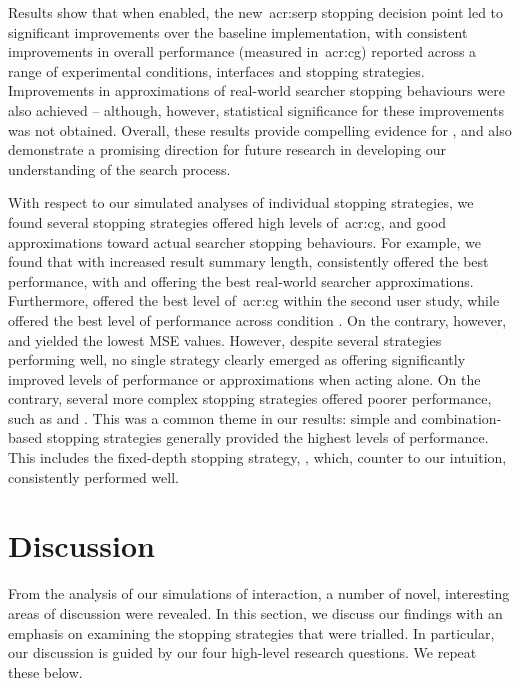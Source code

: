 Results show that when enabled, the new~\gls{acr:serp} stopping decision point led to significant improvements over the baseline implementation, with consistent improvements in overall performance (measured in~\gls{acr:cg}) reported across a range of experimental conditions, interfaces and stopping strategies. Improvements in approximations of real-world searcher stopping behaviours were also achieved -- although, however, statistical significance for these improvements was not obtained. Overall, these results provide compelling evidence for , and also demonstrate a promising direction for future research in developing our understanding of the search process.

With respect to our simulated analyses of individual stopping strategies, we found several stopping strategies offered high levels of~\gls{acr:cg}, and good approximations toward actual searcher stopping behaviours. For example, we found that with increased result summary length,  consistently offered the best performance, with  and  offering the best real-world searcher approximations. Furthermore,  offered the best level of~\gls{acr:cg} within the second user study, while  offered the best level of performance across condition . On the contrary, however,  and  yielded the lowest MSE values. However, despite several strategies performing well, no single strategy clearly emerged as offering significantly improved levels of performance or approximations when acting alone. On the contrary, several more complex stopping strategies offered poorer performance, such as  and . This was a common theme in our results: simple and combination-based stopping strategies generally provided the highest levels of performance. This includes the fixed-depth stopping strategy, , which, counter to our intuition, consistently performed well.

\section{Discussion}\label{sec:conclusions:discussion}
From the analysis of our simulations of interaction, a number of novel, interesting areas of discussion were revealed. In this section, we discuss our findings with an emphasis on examining the stopping strategies that were trialled. In particular, our discussion is guided by our four high-level research questions. We repeat these below.

